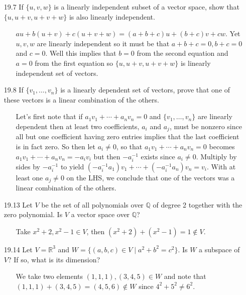\documentclass[12pt]{article}
\begin{document}
\begin{enumerate}
\item[19.7] If $\{u, v, w\}$ is a linearly independent subset of a vector space, show that $\{u, u+v, u+v+w\}$ is also linearly independent.
\begin{enumerate}
\item[] $au + b(u+v) + c(u+v+w) = (a+b+c)u + (b+c)v + cw$. Yet $u, v, w$ are linearly independent so it must be that $a+b+c=0, b+c=0$ and $c=0$. Well this implies that $b=0$ from the second equation and $a=0$ from the first equation so $\{u, u+v, u+v+w\}$ is linearly independent set of vectors.
\end{enumerate}

\item[19.8] If $\{v_1, \ldots, v_n\}$ is a linearly dependent set of vectors, prove that one of these vectors is a linear combination of the others.
\begin{enumerate}
\item[] Let's first note that if $a_1v_1 + \cdots + a_nv_n = 0$ and $\{ v_1, \ldots, v_n \}$ are linearly dependent then at least two coefficients, $a_i$ and $a_j$, must be nonzero since all but one coefficient having zero entries implies that the last coefficient is in fact zero. So then let $a_i \neq 0$, so that $
a_1v_1 + \cdots + a_nv_n = 0$ becomes $a_1v_1 + \cdots + a_nv_n = -a_iv_i$ but then $-a_i^{-1}$ exists since $a_i \neq 0$. Multiply by sides by $-a_i^{-1}$ to yield $(-a_i^{-1}a_1)v_1 + \cdots + (-a_i^{-1}a_n)v_n = v_i$. With at least one $a_j \neq 0$ on the LHS, we conclude that one of the vectors was a linear combination of the others.
\end{enumerate}

\item[19.13] Let $V$ be the set of all polynomials over $\mathbb{Q}$ of degree 2 together with the zero polynomial. Is $V$ a vector space over $\mathbb{Q}$?
\begin{enumerate}
\item[] Take $x^2 + 2, x^2 - 1 \in V$, then $(x^2 + 2) + (x^2 - 1) = 1 \not\in V$.
\end{enumerate}

\item[19.14] Let $V = \mathbb{R}^3$ and $W = \{(a,b,c) \in V \mid a^2+b^2=c^2\}$. Is $W$ a subspace of $V$? If so, what is its dimension?
\begin{enumerate}
\item[] We take two elements $(1,1,1),(3,4,5) \in W$ and note that $(1,1,1)+(3,4,5) = (4, 5, 6) \not\in W$ since $4^2 + 5^2 \neq 6^2$.
\end{enumerate}


\end{enumerate}
\end{document}

